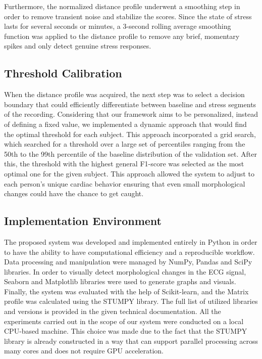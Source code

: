 \documentclass[conference,10pt]{IEEEtran}
\begin{document}
Furthermore, the normalized distance profile underwent a smoothing step in order to remove transient noise and stabilize the scores. Since the state of stress lasts for several seconds or minutes, a 3-second rolling average smoothing function was applied to the distance profile to remove any brief, momentary spikes and only detect genuine stress responses.

\subsection{Threshold Calibration}

When the distance profile was acquired, the next step was to select a decision boundary that could efficiently differentiate between baseline and stress segments of the recording. Considering that our framework aims to be personalized, instead of defining a fixed value, we implemented a dynamic approach that would find the optimal threshold for each subject. 
This approach incorporated a grid search, which searched for a threshold over a large set of percentiles ranging from the 50th to the 99th percentile of the baseline distribution of the validation set. After this, the threshold with the highest general F1-score was selected as the most optimal one for the given subject. This approach allowed the system to adjust to each person’s unique cardiac behavior ensuring that even small morphological changes could have the chance to get caught. 

\subsection{Implementation Environment}

The proposed system was developed and implemented entirely in Python in order to have the ability to have computational efficiency and a reproducible workflow. Data processing and manipulation were managed by NumPy, Pandas and SciPy libraries. In order to visually detect morphological changes in the ECG signal, Seaborn and Matplotlib libraries were used to generate graphs and visuals. Finally, the system was evaluated with the help of Scikit-learn, and the Matrix profile was calculated using the STUMPY library. The full list of utilized libraries and versions is provided in the given technical documentation.
All the experiments carried out in the scope of our system were conducted on a local CPU-based machine. This choice was made due to the fact that the STUMPY library is already constructed in a way that can support parallel processing across many cores and does not require GPU acceleration.
\end{document}
